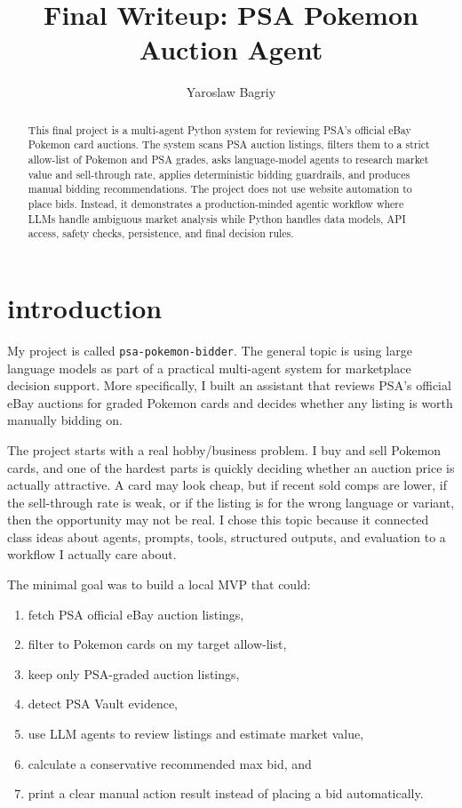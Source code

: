 \documentclass[10pt,twocolumn]{article}
\title{Final Writeup: PSA Pokemon Auction Agent}
\author{Yaroslaw Bagriy}
\begin{document}
\maketitle

\begin{abstract}
This final project is a multi-agent Python system for reviewing PSA's official eBay Pokemon card auctions. The system scans PSA auction listings, filters them to a strict allow-list of Pokemon and PSA grades, asks language-model agents to research market value and sell-through rate, applies deterministic bidding guardrails, and produces manual bidding recommendations. The project does not use website automation to place bids. Instead, it demonstrates a production-minded agentic workflow where LLMs handle ambiguous market analysis while Python handles data models, API access, safety checks, persistence, and final decision rules.
\end{abstract}

\section{introduction}

My project is called \texttt{psa-pokemon-bidder}. The general topic is using large language models as part of a practical multi-agent system for marketplace decision support. More specifically, I built an assistant that reviews PSA's official eBay auctions for graded Pokemon cards and decides whether any listing is worth manually bidding on.

The project starts with a real hobby/business problem. I buy and sell Pokemon cards, and one of the hardest parts is quickly deciding whether an auction price is actually attractive. A card may look cheap, but if recent sold comps are lower, if the sell-through rate is weak, or if the listing is for the wrong language or variant, then the opportunity may not be real. I chose this topic because it connected class ideas about agents, prompts, tools, structured outputs, and evaluation to a workflow I actually care about.

The minimal goal was to build a local MVP that could:
\begin{enumerate}[leftmargin=*]
    \item fetch PSA official eBay auction listings,
    \item filter to Pokemon cards on my target allow-list,
    \item keep only PSA-graded auction listings,
    \item detect PSA Vault evidence,
    \item use LLM agents to review listings and estimate market value,
    \item calculate a conservative recommended max bid, and
    \item print a clear manual action result instead of placing a bid automatically.
\end{enumerate}
\end{document}
